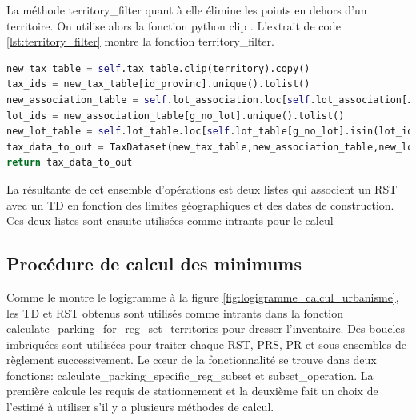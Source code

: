         La méthode territory\_filter quant à elle élimine les points en dehors d'un territoire. On utilise alors la fonction python clip \parencite{geopandas_developers_geopandasclip_nodate}. L'extrait de code \ref{lst:territory_filter} montre la fonction territory\_filter.
\begin{lstlisting}[language=Python, caption= fonction territory\_filter, label=lst:territory_filter]
new_tax_table = self.tax_table.clip(territory).copy()
tax_ids = new_tax_table[id_provinc].unique().tolist()
new_association_table = self.lot_association.loc[self.lot_association[id_provinc].isin(tax_ids)].copy()
lot_ids = new_association_table[g_no_lot].unique().tolist()
new_lot_table = self.lot_table.loc[self.lot_table[g_no_lot].isin(lot_ids)].copy()
tax_data_to_out = TaxDataset(new_tax_table,new_association_table,new_lot_table)
return tax_data_to_out
\end{lstlisting}
        La résultante de cet ensemble d'opérations est deux listes qui associent un \ac*{RST} avec un \ac*{TD} en fonction des limites géographiques et des dates de construction. Ces deux listes sont ensuite utilisées comme intrants pour le calcul
    \subsection{Procédure de calcul des minimums}
        Comme le montre le logigramme à la figure \ref{fig:logigramme_calcul_urbanisme}, les \ac{TD} et \ac{RST} obtenus sont utilisés comme intrants dans la fonction calculate\_parking\_for\_reg\_set\_territories pour dresser l'inventaire. Des boucles imbriquées sont utilisées pour traiter chaque \ac{RST}, \ac{PRS}, \ac{PR} et sous-ensembles de règlement successivement. Le cœur de la fonctionnalité se trouve dans deux fonctions: calculate\_parking\_specific\_reg\_subset et subset\_operation. La première calcule les requis de stationnement et la deuxième fait un choix de l'estimé à utiliser s'il y a plusieurs méthodes de calcul.
